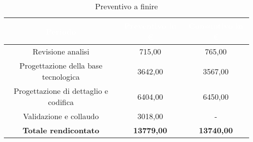 \begin{flushleft}
\begin{table}[!h]
\begin{center}
			
			\begin{tabular}{ccc}
				
				\rowcolor{coolblack}
				\hline
				\textcolor{white}{Periodo} & \textcolor{white}{Preventivo in \euro} & \textcolor{white}{Consuntivo in \euro}\\
				\hline
				Revisione analisi& 715,00 & 765,00 \\ 	
				Progettazione della base tecnologica& 3642,00 & 3567,00\\ 
				Progettazione di dettaglio e codifica& 6404,00   & 6450,00\\ 
				Validazione e collaudo & 3018,00 & - \\ \hline
				\textbf{Totale rendicontato}& \textbf{13779,00} & \textbf{13740,00}	\\ \hline   
				
			\end{tabular}
			\caption{Preventivo a finire} 
		\end{center}		
	\end{table}


\end{flushleft}